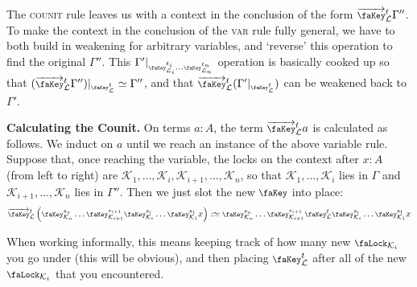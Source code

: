 \documentclass[10pt]{article}
\theoremstyle{definition}
\let\oldequiv\equiv%
\renewcommand{\equiv}{\simeq}
\newcommand{\defeq}{\oldequiv}
\newcommand{\rulen}[1]{\textsc{#1}}
\newcommand{\lock}{\mathchoice
{\scalebox{0.8}{\text{\faLock}}}
{\scalebox{0.8}{\text{\faLock}}}
{\scalebox{0.5}{\text{\faLock}}}
{\scalebox{0.4}{\text{\faLock}}}
}
\newcommand{\key}{\mathchoice
{\scalebox{0.8}{\text{\faKey}}}
{\scalebox{0.8}{\text{\faKey}}}
{\scalebox{0.5}{\text{\faKey}}}
{\scalebox{0.4}{\text{\faKey}}}
}
\newcommand{\lockn}[1]{\mathcal{#1}}
\newcommand{\varkey}[2]{\key_{\lockn{#1}}^{#2}}
\newcommand{\varkeye}[2]{\key_{#1}^{#2}}
\newcommand{\admkey}[2]{\overrightarrow{\key}_{\lockn{#1}}^{#2}}
\newcommand{\admkeye}[2]{\overrightarrow{\key}_{#1}^{#2}}
\newcommand{\ctxlocke}[1]{\lock_{#1}}
\begin{document}
\begin{itemize}
{The \rulen{counit} rule leaves us with a context in the conclusion of the form $\admkey{L}{t}\Gamma''$. To make the context in the conclusion of the \rulen{var} rule fully general, we have to both build in weakening for arbitrary variables, and `reverse' this operation to find the original $\Gamma''$. This $\Gamma'|_{\varkeye{\lockn{L}_i}{t_i}\dots\varkeye{\lockn{L}_n}{t_n}}$ operation is basically cooked up so that $(\admkey{L}{t}\Gamma'')|_{\varkey{L}{t}} \defeq \Gamma''$, and that $\admkey{L}{t}(\Gamma'|_{\varkey{L}{t}})$ can be weakened back to $\Gamma'$.

\item \textbf{Calculating the Counit.}
On terms $a : A$, the term $\admkey{L}{t} a$ is calculated as
follows. We induct on $a$ until we reach an instance of the above
variable rule. Suppose that, once reaching the variable,  the locks on the context after $x : A$ (from left to right) are $\lockn{K}_1, \dots,\lockn{K}_i, \lockn{K}_{i+1}, \dots, \lockn{K}_n$, so that $\lockn{K}_1, \dots,\lockn{K}_i$ lies in $\Gamma$ and $\lockn{K}_{i+1}, \dots, \lockn{K}_n$ lies in $\Gamma''$. Then we just slot the new $\key$ into place:
\begin{align*}
\admkeye{\lockn{L}}{t}  \left(\varkeye{\lockn{K}_n}{s_n} \dots \varkeye{\lockn{K}_{i+1}}{s_{i+1}} \varkeye{\lockn{K}_i}{s_i} \dots \varkeye{\lockn{K}_1}{s_1} x\right) :\defeq \varkeye{\lockn{K}_n}{s_n} \dots \varkeye{\lockn{K}_{i+1}}{s_{i+1}} \varkeye{\lockn{L}}{t}  \varkeye{\lockn{K}_i}{s_i} \dots \varkeye{\lockn{K}_1}{s_1} x
\end{align*}

When working informally, this means keeping track of how many new $\ctxlocke{\lockn{K}_i}$ you go under (this will be obvious), and then placing $\varkeye{\lockn{L}}{t}$ after all of the new $\ctxlocke{\lockn{K}_i}$ that you encountered.

}
\end{itemize}
\end{document}
